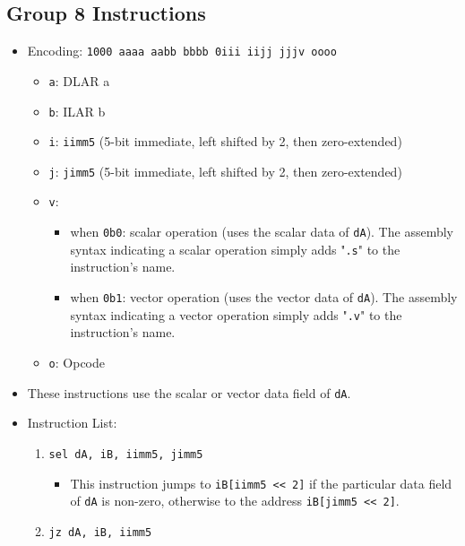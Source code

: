 \documentclass{article}
\begin{document}
	\subsection{Group 8 Instructions}
		\begin{itemize}
		\item Encoding: \texttt{1000 aaaa aabb bbbb  0iii iijj jjjv oooo}
			\begin{itemize}
			\item \texttt{a}: DLAR a
			\item \texttt{b}: ILAR b
			\item \texttt{i}: \texttt{iimm5} (5-bit immediate, left shifted
				by 2, then zero-extended)
			\item \texttt{j}: \texttt{jimm5} (5-bit immediate, left shifted
				by 2, then zero-extended)
			\item \texttt{v}:
				\begin{itemize}
				\item when \texttt{0b0}: scalar operation (uses the scalar
					data of \texttt{dA}). The assembly syntax indicating a
					scalar operation simply adds "\texttt{.s}" to the
					instruction's name.
				\item when \texttt{0b1}: vector operation (uses the vector
					data of \texttt{dA}). The assembly syntax indicating a
					vector operation simply adds "\texttt{.v}" to the
					instruction's name.
				\end{itemize}
			\item \texttt{o}: Opcode
			\end{itemize}
		\item These instructions use the scalar or vector data field of
			\texttt{dA}.
		\item Instruction List:
			\begin{enumerate}
			\item \texttt{sel dA, iB, iimm5, jimm5}
				\begin{itemize}
				\item This instruction jumps to \texttt{iB[iimm5 << 2]} if
					the particular data field of \texttt{dA} is non-zero,
					otherwise to the address \texttt{iB[jimm5 << 2]}.
				\end{itemize}
			\item \texttt{jz dA, iB, iimm5}

\end{enumerate}
\end{itemize}
\end{document}
